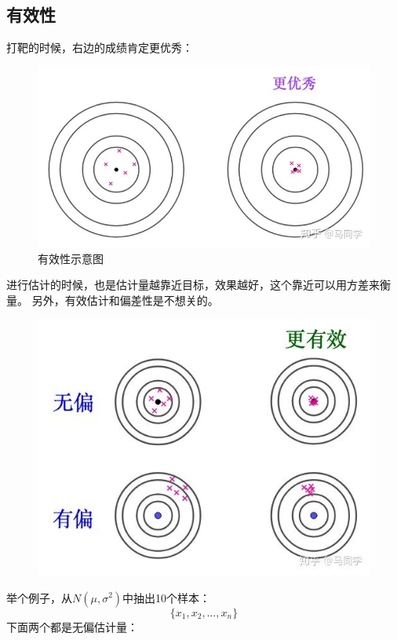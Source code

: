 \documentclass{article}
\begin{document}
\subsection{有效性}
打靶的时候，右边的成绩肯定更优秀：
\begin{figure}[!tbp]
    \centering
    \includegraphics[width=15cm]{figure6.jpg}
    \caption{有效性示意图}
\end{figure}
进行估计的时候，也是估计量越靠近目标，效果越好，这个靠近可以用方差来衡量。
另外，有效估计和偏差性是不想关的。
\begin{figure}[!tbp]
    \centering
    \includegraphics[width=15cm]{figure7.jpg}
\end{figure}
\par
举个例子，从$N(\mu,\sigma^2)$中抽出10个样本：
\begin{equation}
    \{x_1,x_2,\dots,x_n\}
\end{equation}
下面两个都是无偏估计量：
\end{document}
